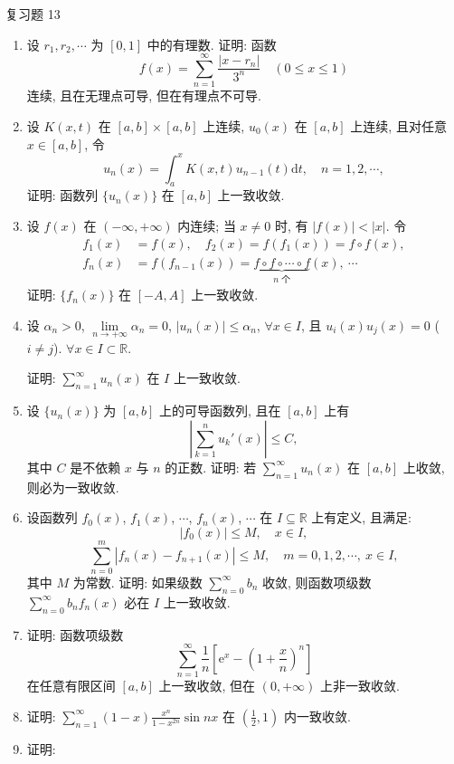 \begin{exblock}{复习题 13}
\begin{enumerate}
  则 $\int_{a}^{+\infty}\left(\sum_{n=1}^{\infty}u_{n}(x)\right)\mathrm{d}x$ 与 $\sum_{n=1}^{\infty}\int_{a}^{+\infty}u_{n}(x)\mathrm{d}x$ 都收敛, 且
  \[
    \int_{a}^{+\infty}\left(\sum_{n=1}^{\infty}u_{n}(x)\right)\mathrm{d}x=\sum_{n=1}^{\infty}\int_{a}^{+\infty}u_{n}(x)\mathrm{d}x.
\]
  \item 设 $r_{1},r_{2},\cdots$ 为 $[0,1]$ 中的有理数. 证明: 函数
  \[
    f(x)=\sum_{n=1}^{\infty}\frac{|x-r_{n}|}{3^{n}}\quad(0\leqslant x\leqslant1)
\]
  连续, 且在无理点可导, 但在有理点不可导.
  \item 设 $K(x,t)$ 在 $[a,b]\times[a,b]$ 上连续, $u_{0}(x)$ 在 $[a,b]$ 上连续, 且对任意 $x\in[a,b]$, 令
  \[
    u_{n}(x)=\int_{a}^{x}K(x,t)u_{n-1}(t)\mathrm{d}t,\quad n=1,2,\cdots,
\]
  证明: 函数列 $\{u_{n}(x)\}$ 在 $[a,b]$ 上一致收敛.
  \item 设 $f(x)$ 在 $(-\infty,+\infty)$ 内连续; 当 $x\neq0$ 时, 有 $|f(x)|<|x|$. 令
  \[
    \begin{aligned}
      f_{1}(x)&=f(x),\quad f_{2}(x)=f(f_{1}(x))=f\circ f(x),\\
      f_{n}(x)&=f(f_{n-1}(x))=\underbrace{f\circ f\circ\cdots\circ f}_{n\text{ 个}}(x),\ \cdots
    \end{aligned}
\]
  证明: $\{f_{n}(x)\}$ 在 $[-A,A]$ 上一致收敛.
  \item 设 $\alpha_{n}>0$, $\lim\limits_{n\to+\infty}\alpha_{n}=0$, $|u_{n}(x)|\leqslant\alpha_{n}$, $\forall x\in I$, 且 $u_{i}(x)u_{j}(x)=0$ ($i\neq j$). $\forall x\in I\subset\mathbb{R}$.

  证明: $\sum_{n=1}^{\infty}u_{n}(x)$ 在 $I$ 上一致收敛.
  \item 设 $\{u_{n}(x)\}$ 为 $[a,b]$ 上的可导函数列, 且在 $[a,b]$ 上有
  \[
    \left|\sum_{k=1}^{n}u_{k}'(x)\right|\leqslant C,
\]
  其中 $C$ 是不依赖 $x$ 与 $n$ 的正数. 证明: 若 $\sum_{n=1}^{\infty}u_{n}(x)$ 在 $[a,b]$ 上收敛, 则必为一致收敛.
  \item 设函数列 $f_{0}(x)$, $f_{1}(x)$, $\cdots$, $f_{n}(x)$, $\cdots$ 在 $I\subseteq\mathbb{R}$ 上有定义, 且满足:
  \[
    |f_{0}(x)|\leqslant M,\quad x\in I,
\]
  \[
    \sum_{n=0}^{m}|f_{n}(x)-f_{n+1}(x)|\leqslant M,\quad m=0,1,2,\cdots,\ x\in I,
\]
  其中 $M$ 为常数. 证明: 如果级数 $\sum_{n=0}^{\infty}b_{n}$ 收敛, 则函数项级数 $\sum_{n=0}^{\infty}b_{n}f_{n}(x)$ 必在 $I$ 上一致收敛.
  \item 证明: 函数项级数
  \[
    \sum_{n=1}^{\infty}\frac{1}{n}\left[\mathrm{e}^{x}-\left(1+\frac{x}{n}\right)^{n}\right]
\]
  在任意有限区间 $[a,b]$ 上一致收敛, 但在 $(0,+\infty)$ 上非一致收敛.
  \item 证明: $\sum_{n=1}^{\infty}(1-x)\frac{x^{n}}{1-x^{2n}}\sin nx$ 在 $\left(\frac{1}{2},1\right)$ 内一致收敛.
  \item 证明:


\end{enumerate}
\end{exblock}
